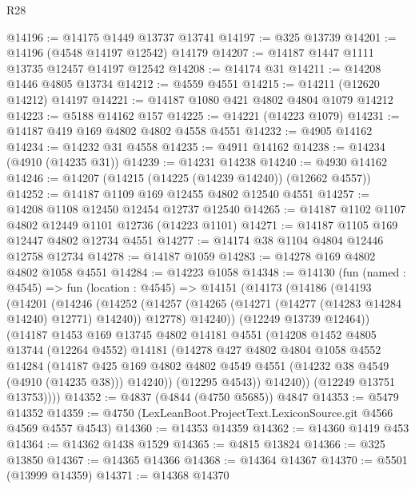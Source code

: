 \begin{lexlean}{R28}
\begin{coremodule}
@14196 := @14175 @1449 @13737 @13741
@14197 := @325 @13739
@14201 := @14196 (@4548 @14197 @12542) @14179
@14207 := @14187 @1447 @1111 @13735 @12457 @14197 @12542
@14208 := @14174 @31
@14211 := @14208 @1446 @4805 @13734
@14212 := @4559 @4551
@14215 := @14211 (@12620 @14212) @14197
@14221 := @14187 @1080 @421 @4802 @4804 @1079 @14212
@14223 := @5188 @14162 @157
@14225 := @14221 (@14223 @1079)
@14231 := @14187 @419 @169 @4802 @4802 @4558 @4551
@14232 := @4905 @14162
@14234 := @14232 @31 @4558
@14235 := @4911 @14162
@14238 := @14234 (@4910 (@14235 @31))
@14239 := @14231 @14238
@14240 := @4930 @14162
@14246 := @14207 (@14215 (@14225 (@14239 @14240)) (@12662 @4557))
@14252 := @14187 @1109 @169 @12455 @4802 @12540 @4551
@14257 := @14208 @1108 @12450 @12454 @12737 @12540
@14265 := @14187 @1102 @1107 @4802 @12449 @1101 @12736 (@14223 @1101)
@14271 := @14187 @1105 @169 @12447 @4802 @12734 @4551
@14277 := @14174 @38 @1104 @4804 @12446 @12758 @12734
@14278 := @14187 @1059
@14283 := @14278 @169 @4802 @4802 @1058 @4551
@14284 := @14223 @1058
@14348 := @14130
    (fun (named : @4545) =>
    fun (location : @4545) =>
    @14151
      (@14173
        (@14186
          (@14193
            (@14201
              (@14246
                (@14252
                  (@14257 (@14265 (@14271 (@14277 (@14283 @14284 @14240) @12771) @14240)) @12778)
                  @14240))
              (@12249 @13739 @12464))
            (@14187
              @1453
              @169
              @13745
              @4802
              @14181
              @4551
              (@14208
                @1452
                @4805
                @13744
                (@12264 @4552)
                @14181
                (@14278
                  @427
                  @4802
                  @4804
                  @1058
                  @4552
                  @14284
                  (@14187
                    @425
                    @169
                    @4802
                    @4802
                    @4549
                    @4551
                    (@14232 @38 @4549 (@4910 (@14235 @38)))
                    @14240))
                (@12295 @4543))
              @14240))
          (@12249 @13751 @13753))))
@14352 := @4837 (@4844 (@4750 @5685)) @4847
@14353 := @5479 @14352
@14359 := @4750 (LexLeanBoot.ProjectText.LexiconSource.git @4566 @4569 @4557 @4543)
@14360 := @14353 @14359
@14362 := @14360 @1419 @453
@14364 := @14362 @1438 @1529
@14365 := @4815 @13824
@14366 := @325 @13850
@14367 := @14365 @14366
@14368 := @14364 @14367
@14370 := @5501 (@13999 @14359)
@14371 := @14368 @14370

\end{coremodule}
\end{lexlean}
